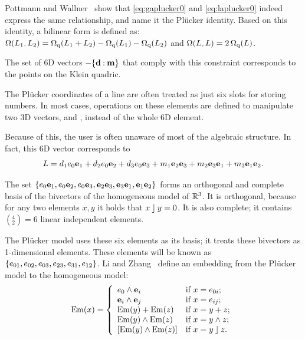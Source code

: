 Pottmann and Wallner~\cite[Lemma 2.1.2]{Pottmann} show that \autoref{eq:gaplucker0} and \autoref{eq:laplucker0} indeed express the same relationship, and name it the Pl\"ucker identity.  Based on this identity, a bilinear form is defined as: $\operatorname{\Omega}(L_1, L_2) = \operatorname{\Omega_q}(L_1 + L_2) - \operatorname{\Omega_q}(L_1) - \operatorname{\Omega_q}(L_2)$ and $\operatorname{\Omega}(L, L) = 2 \operatorname{\Omega_q}(L)$.  

The set of 6D vectors $-\{\mathbf{d} \mathbin{:} \mathbf{m}\}$ that comply with this constraint corresponds to the points on the Klein quadric.

The Pl\"ucker coordinates of a line are often treated as just six slots for storing numbers.  In most cases, operations on these elements are defined to manipulate two 3D vectors,  and , instead of the whole 6D element.  

Because of this, the user is often unaware of most of the algebraic structure.  In fact, this 6D vector corresponds to
\begin{equation*}
  L = d_1 e_0\mathbf{e}_1 + d_2 e_0\mathbf{e}_2 + d_3 e_0\mathbf{e}_3 + m_1 \mathbf{e}_2\mathbf{e}_3 + m_2 \mathbf{e}_3\mathbf{e}_1 + m_3 \mathbf{e}_1\mathbf{e}_2 .
\end{equation*}

The set $\{e_0\mathbf{e}_1, e_0\mathbf{e}_2, e_0\mathbf{e}_3, \mathbf{e}_2\mathbf{e}_3, \mathbf{e}_3\mathbf{e}_1, \mathbf{e}_1\mathbf{e}_2\}$ forms an orthogonal and complete basis of the bivectors of the homogeneous model of $\mathbb{R}^3$.  It is orthogonal, because for any two elements $x, y$ it holds that $x \mathbin{\rfloor} y = 0$. It is also complete; it contains $(^4_2) = 6$ linear independent elements.

The Pl\"ucker model uses these six elements as its basis; it treats these bivectors as 1-dimensional elements.  These elements will be known as $\{e_{01}, e_{02}, e_{03}, e_{23}, e_{31}, e_{12}\}$.  Li and Zhang~\cite{Hongbo} define an embedding from the Pl\"ucker model to the homogeneous model:
\begin{equation} \label{eq:Em}
  \operatorname{Em}(x) = \left\{ 
    \begin{array}{ll}
      e_0 \wedge \mathbf{e}_i &\mbox{if $x = e_{0i}$}; \\
      \mathbf{e}_i \wedge \mathbf{e}_j &\mbox{if $x = e_{ij}$}; \\
      \operatorname{Em}(y) + \operatorname{Em}(z) &\mbox{if $x = y + z$}; \\
      \operatorname{Em}(y) \wedge \operatorname{Em}(z) &\mbox{if $x = y \wedge z$}; \\
      \left[\operatorname{Em}(y) \wedge \operatorname{Em}(z)\right] &\mbox{if $x = y \mathbin{\rfloor} z$}. \\
    \end{array}
    \right.
\end{equation}

